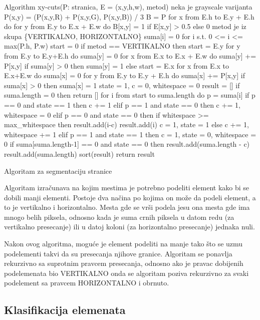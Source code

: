 \documentclass[]{amsart}
\begin{document}
\begin{program}
	\begin{CodeListing}
Algorithm xy-cuts(P: stranica, E = (x,y,h,w), metod)
	neka je grayscale varijanta 
		P(x,y) = (P(x,y,R) + P(x,y,G), P(x,y,B)) / 3 
	B = P
	for x from E.h to E.y + E.h do
		for y from E.y to E.x + E.w do
			B[x,y] = 1 if E[x,y] > 0.5 else 0 
	metod je iz skupa \{VERTIKALNO, HORIZONTALNO\}
	suma[i] = 0 for i s.t. 0 <= i <= max(P.h, P.w)
	start = 0 
	if metod == VERTIKALNO then 
		start = E.y
		for y from E.y to E.y+E.h do
			suma[y] = 0
			for x from E.x to E.x + E.w do
				suma[y] += P[x,y]
			if suma[y] > 0 then suma[y] = 1
	else
		start = E.x
		for x from E.x to E.x+E.w do
			suma[x] = 0
			for y from E.y to E.y + E.h do
				suma[x] += P[x,y]
			if suma[x] > 0 then suma[x] = 1
	state = 1, c = 0, whitespace = 0
	result = []
	if suma.length = 0 then return []
	for i from start to suma.length do
		p = suma[i]
		if p == 0 and state == 1 then c += 1 
		elif p == 1 and state == 0 then 
			c += 1, whitespace = 0
		elif p == 0 and state == 0 then 
			if whitespace >= max_whitespace then 
				result.add(i-c)
				result.add(i)
				c = 1, state = 1 
			else
				c += 1, whitespace += 1
		elif p == 1 and state == 1 then 
			c = 1, state = 0, whitespace = 0
	if suma[suma.length-1] == 0 and state == 0 then 
		result.add(suma.length - c)
		result.add(suma.length)
	sort(result)
	return result 
	\end{CodeListing}
	\caption{Algoritam za segmentaciju stranice}
\end{program}

Algoritam izračunava na kojim mestima je potrebno podeliti element kako bi se dobili manji elementi. Postoje dva načina po kojima on može da podeli element, a to je
vertikalno i horizontalno. Mesta gde se vrši podela jesu ona mesta gde ima mnogo belih piksela, odnosno kada je suma crnih piksela u datom redu (za vertikalno presecanje)
ili u datoj koloni (za horizontalno presecanje) jednaka nuli.

Nakon ovog algoritma, moguće je element podeliti na manje tako što se uzmu podelementi takvi da su presecanja njihove granice. Algoritam se ponavlja rekurzivno
sa suprotnim pravcem presecanja, odnosno ako je pravac dobijenih podelemenata bio VERTIKALNO onda se algoritam poziva rekurzivno za svaki podelement sa pravcem HORIZONTALNO
i obrnuto. 

\subsection{Klasifikacija elemenata}
\label{sec:org4f634b4}
\end{document}
